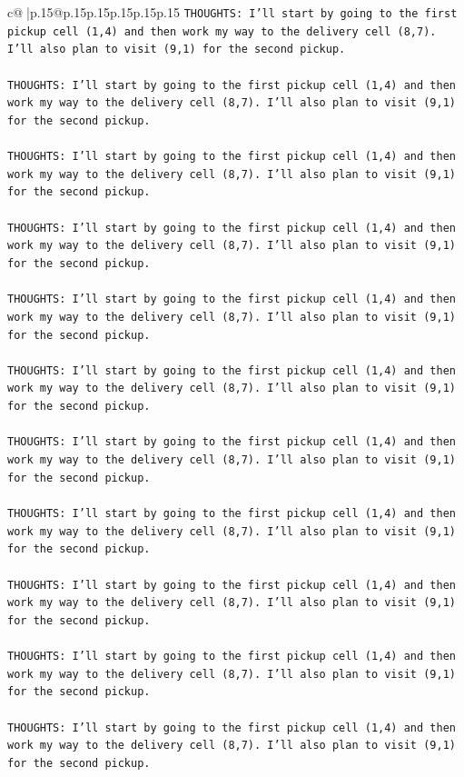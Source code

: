 \documentclass{article}
\begin{document}
{\begin{supertabular}{c@{$\;$}|p{.15\linewidth}@{}p{.15\linewidth}p{.15\linewidth}p{.15\linewidth}p{.15\linewidth}p{.15\linewidth}}
{{{\texttt{THOUGHTS: I'll start by going to the first pickup cell (1,4) and then work my way to the delivery cell (8,7). I'll also plan to visit (9,1) for the second pickup.} \\
\\ 
\texttt{THOUGHTS: I'll start by going to the first pickup cell (1,4) and then work my way to the delivery cell (8,7). I'll also plan to visit (9,1) for the second pickup.} \\
\\ 
\texttt{THOUGHTS: I'll start by going to the first pickup cell (1,4) and then work my way to the delivery cell (8,7). I'll also plan to visit (9,1) for the second pickup.} \\
\\ 
\texttt{THOUGHTS: I'll start by going to the first pickup cell (1,4) and then work my way to the delivery cell (8,7). I'll also plan to visit (9,1) for the second pickup.} \\
\\ 
\texttt{THOUGHTS: I'll start by going to the first pickup cell (1,4) and then work my way to the delivery cell (8,7). I'll also plan to visit (9,1) for the second pickup.} \\
\\ 
\texttt{THOUGHTS: I'll start by going to the first pickup cell (1,4) and then work my way to the delivery cell (8,7). I'll also plan to visit (9,1) for the second pickup.} \\
\\ 
\texttt{THOUGHTS: I'll start by going to the first pickup cell (1,4) and then work my way to the delivery cell (8,7). I'll also plan to visit (9,1) for the second pickup.} \\
\\ 
\texttt{THOUGHTS: I'll start by going to the first pickup cell (1,4) and then work my way to the delivery cell (8,7). I'll also plan to visit (9,1) for the second pickup.} \\
\\ 
\texttt{THOUGHTS: I'll start by going to the first pickup cell (1,4) and then work my way to the delivery cell (8,7). I'll also plan to visit (9,1) for the second pickup.} \\
\\ 
\texttt{THOUGHTS: I'll start by going to the first pickup cell (1,4) and then work my way to the delivery cell (8,7). I'll also plan to visit (9,1) for the second pickup.} \\
\\ 
\texttt{THOUGHTS: I'll start by going to the first pickup cell (1,4) and then work my way to the delivery cell (8,7). I'll also plan to visit (9,1) for the second pickup.} \\
}}}
\end{supertabular}}
\end{document}
